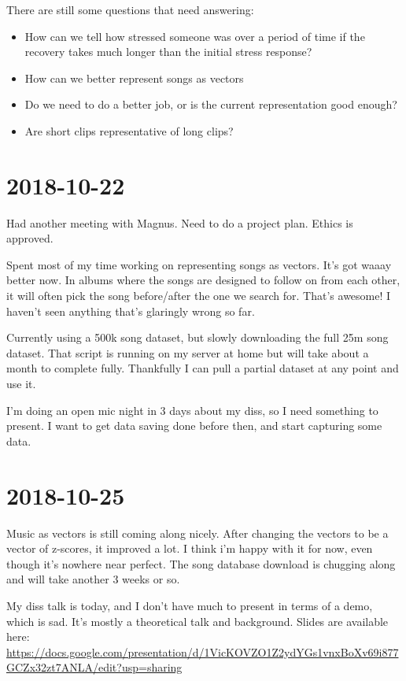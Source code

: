 \documentclass{article}
\begin{document}
	There are still some questions that need answering:

	\begin{itemize}
		\item How can we tell how stressed someone was over a period of time if the recovery takes much longer than the initial stress response?
		\item How can we better represent songs as vectors
		\item Do we need to do a better job, or is the current representation good enough?
		\item Are short clips representative of long clips?
	\end{itemize}

	\section{2018-10-22}
	Had another meeting with Magnus. Need to do a project plan. Ethics is approved.
	
	Spent most of my time working on representing songs as vectors. It's got waaay better now. In albums where the songs are designed to follow on from each other, it will often pick the song before/after the one we search for. That's awesome! I haven't seen anything that's glaringly wrong so far.
	
	Currently using a 500k song dataset, but slowly downloading the full 25m song dataset. That script is running on my server at home but will take about a month to complete fully. Thankfully I can pull a partial dataset at any point and use it.
	
	I'm doing an open mic night in 3 days about my diss, so I need something to present. I want to get data saving done before then, and start capturing some data.
	
	\section{2018-10-25}
	Music as vectors is still coming along nicely. After changing the vectors to be a vector of z-scores, it improved a lot. I think i'm happy with it for now, even though it's nowhere near perfect. The song database download is chugging along and will take another 3 weeks or so.
	
	My diss talk is today, and I don't have much to present in terms of a demo, which is sad. It's mostly a theoretical talk and background. Slides are available here: \url{https://docs.google.com/presentation/d/1VicKOVZO1Z2ydYGs1vnxBoXv69i877GCZx32zt7ANLA/edit?usp=sharing}
	
\end{document}
